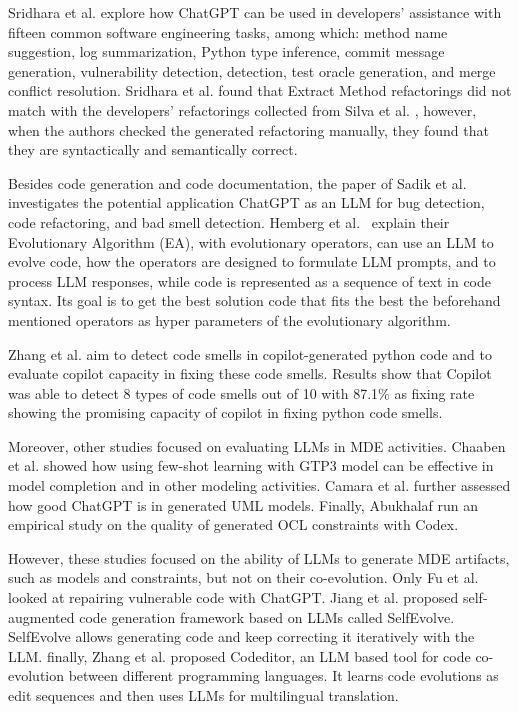 Sridhara et al. \cite{sridhara2023chatgpt} explore how ChatGPT can be used in developers' assistance with fifteen common software engineering tasks, among which: method name suggestion, log summarization, Python type inference, commit message generation, vulnerability detection, detection, test oracle generation, and merge conflict resolution. Sridhara et al. \cite{sridhara2023chatgpt} found that Extract Method refactorings did not match with the developers' refactorings collected from Silva et al. \cite{10.1145/2950290.2950305}, however, when the authors checked the generated refactoring manually, they found that they are syntactically and semantically correct.

  Besides code generation and code documentation, the paper of Sadik et al.~\cite{sadik2023analysis} investigates the potential application ChatGPT as an LLM for bug detection, code refactoring, and bad smell detection.
  Hemberg et al.~\cite{hemberg2024evolving} explain their Evolutionary Algorithm (EA), with evolutionary operators, can use an LLM to evolve code, how the operators are designed to formulate LLM prompts, and to process LLM responses, while code is represented as a sequence of text in code syntax. Its goal is to get the best solution code that fits the best the beforehand mentioned operators as hyper parameters of the evolutionary algorithm.
  
   Zhang et al.\cite{zhang2024copilot} aim to detect code smells in  copilot-generated python code and to evaluate copilot capacity in fixing these code smells. Results show that Copilot was able to detect 8 types of code smells out of 10 with 87.1\% as fixing rate showing the promising capacity of copilot in fixing python code smells.
  
 Moreover, other studies focused on evaluating LLMs in MDE activities. 
 Chaaben et al. \cite{chaaben2023towards} showed how using few-shot learning with GTP3 model can be effective in model completion and in other modeling activities. 
 Camara et al. \cite{camara2023assessment} further assessed how good ChatGPT is in generated UML models.
 Finally, Abukhalaf \cite{AbukhalafHK23} run an empirical study on the quality of generated OCL constraints with Codex.
 
 However, these studies focused on the ability of LLMs to generate MDE artifacts, such as models and constraints, but not on their co-evolution. 
 Only Fu et al. \cite{fu2023chatgpt} looked at repairing vulnerable code with ChatGPT. 
 Jiang et al. \cite{jiang2023selfevolve} proposed self-augmented code generation framework based on LLMs called SelfEvolve. SelfEvolve allows generating code and keep correcting it iteratively with the LLM. %
 finally, Zhang et al. \cite{zhang2023multilingual} proposed Codeditor, an LLM based tool for code co-evolution between different programming languages. It learns code evolutions as edit sequences and then uses LLMs for multilingual translation.
